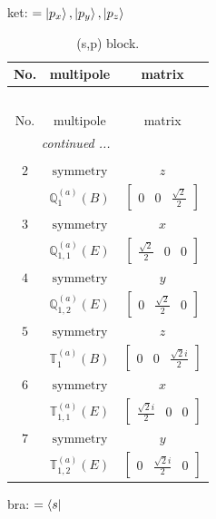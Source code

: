 \documentclass[fleqn,8pt,landscape]{jsarticle}
\begin{document}
\noindent
ket: $=\ket{p_{x}}, \ket{p_{y}}, \ket{p_{z}}$
\renewcommand{\arraystretch}{1.6}
\begin{longtable}{ccc}
\caption{(s,p) block.}
 \\
 \hline \hline
No. & multipole & matrix \\ \hline \endfirsthead

\multicolumn{2}{l}{\tablename\ \thetable{}} \\
 \hline \hline
No. & multipole & matrix \\ \hline \endhead

 \hline \hline
\multicolumn{2}{r}{\footnotesize\it continued ...} \\ \endfoot

 \hline \hline
\multicolumn{2}{r}{} \\ \endlastfoot

$ 2 $ & $ \text{symmetry} $ & $ z $ \\
$  $ & $ \mathbb{Q}_{1}^{(a)}(B) $ & $ \begin{bmatrix} 0 & 0 & \frac{\sqrt{2}}{2} \end{bmatrix} $ \\ \hline
$ 3 $ & $ \text{symmetry} $ & $ x $ \\
$  $ & $ \mathbb{Q}_{1,1}^{(a)}(E) $ & $ \begin{bmatrix} \frac{\sqrt{2}}{2} & 0 & 0 \end{bmatrix} $ \\ \hline
$ 4 $ & $ \text{symmetry} $ & $ y $ \\
$  $ & $ \mathbb{Q}_{1,2}^{(a)}(E) $ & $ \begin{bmatrix} 0 & \frac{\sqrt{2}}{2} & 0 \end{bmatrix} $ \\ \hline
$ 5 $ & $ \text{symmetry} $ & $ z $ \\
$  $ & $ \mathbb{T}_{1}^{(a)}(B) $ & $ \begin{bmatrix} 0 & 0 & \frac{\sqrt{2} i}{2} \end{bmatrix} $ \\ \hline
$ 6 $ & $ \text{symmetry} $ & $ x $ \\
$  $ & $ \mathbb{T}_{1,1}^{(a)}(E) $ & $ \begin{bmatrix} \frac{\sqrt{2} i}{2} & 0 & 0 \end{bmatrix} $ \\ \hline
$ 7 $ & $ \text{symmetry} $ & $ y $ \\
$  $ & $ \mathbb{T}_{1,2}^{(a)}(E) $ & $ \begin{bmatrix} 0 & \frac{\sqrt{2} i}{2} & 0 \end{bmatrix} $ \\ \hline
\end{longtable}
bra: $=\bra{s}$
\end{document}

